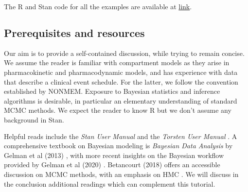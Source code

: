 The R and Stan code for all the examples are available at \url{link}.

 \subsection{Prerequisites and resources}
 
 Our aim is to provide a self-contained discussion, while trying to remain concise.
 We assume the reader is familiar with compartment models as they arise in pharmacokinetic and pharmacodynamic models, and has experience with data that describe a clinical event schedule.
 For the latter, we follow the convention established by NONMEM.
 Exposure to Bayesian statistics and inference algorithms is desirable, in particular an elementary understanding of standard MCMC methods.
 We expect the reader to know R but we don't assume any background in Stan.
 
 Helpful reads include the \textit{Stan User Manual} \cite{author:0000} and the \textit{Torsten User Manual} \cite{author:0000}.
 A comprehensive textbook on Bayesian modeling is \textit{Bayesian Data Analysis} by Gelman et al (2013) \cite{Gelman:2013b}, with more recent insights on the Bayesian workflow provided by Gelman et al (2020) \cite{Gelman:2020}. 
 Betancourt (2018) offers an accessible discussion on MCMC methods, with an emphasis on HMC \cite{Betancourt:2018}.
 We will discuss in the conclusion additional readings which can complement this tutorial.
  
 
 
 